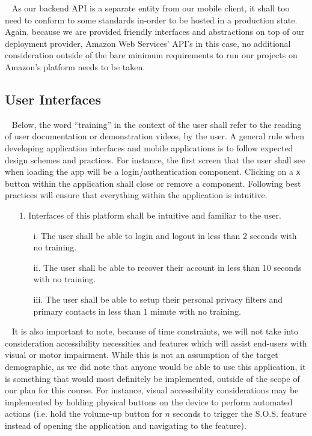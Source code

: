 \documentclass{scrreprt}
\begin{document}
\par ~ As our backend API is a separate entity from our mobile client, it shall too need to conform to some standards in-order to be hosted in a production state. Again, because we are provided friendly interfaces and abstractions on top of our deployment provider, Amazon Web Services' API's in this case, no additional consideration outside of the bare minimum requirements to run our projects on Amazon's platform needs to be taken.


\subsection{User Interfaces}
\par ~ Below, the word ``training'' in the context of the user shall refer to the reading of user documentation or demonstration videos, by the user. A general rule when developing application interfaces and mobile applications is to follow expected design schemes and practices. For instance, the first screen that the user shall see when loading the app will be a login/authentication component. Clicking on a \texttt{x} button within the application shall close or remove a component. Following best practices will ensure that everything within the application is intuitive.
\begin{enumerate}
	\item[1.] Interfaces of this platform shall be intuitive and familiar to the user.
	\begin{itemize}
		\item[i.] The user shall be able to login and logout in less than 2 seconds with no training.
		\item[ii.] The user shall be able to recover their account in less than 10 seconds with no training.
		\item[iii.] The user shall be able to setup their personal privacy filters and primary contacts in less than 1 minute with no training.
	\end{itemize}
\end{enumerate}
\par ~ It is also important to note, because of time constraints, we will not take into consideration accessibility necessities and features which will assist end-users with visual or motor impairment. While this is not an assumption of the target demographic, as we did note that anyone would be able to use this application, it is something that would most definitely be implemented, outside of the scope of our plan for this course. For instance, visual accessibility considerations may be implemented by holding physical buttons on the device to perform automated actions (i.e. hold the volume-up button for $n$ seconds to trigger the S.O.S. feature instead of opening the application and navigating to the feature).
\end{document}
